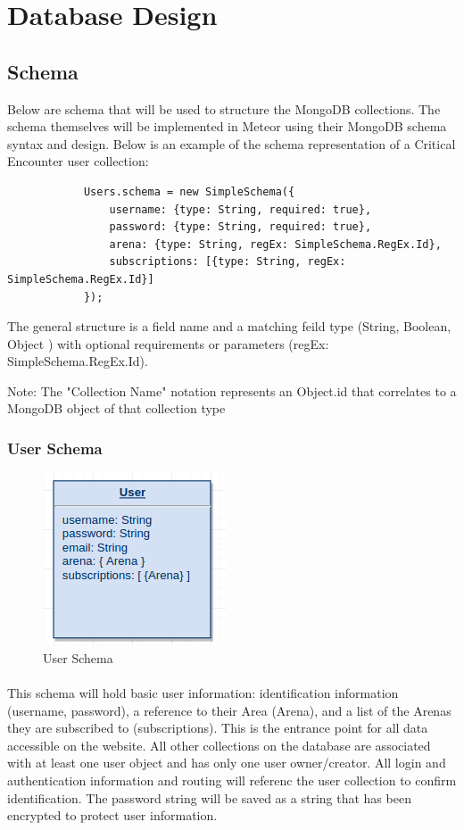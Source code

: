 \documentclass[12pt,a4paper]{report}
\begin{document}
\newpage
\section{Database Design}
	
\subsection{Schema}
		Below are schema that will be used to structure the MongoDB collections. The schema themselves will be implemented in Meteor using their MongoDB schema syntax and design. Below is an example of the schema representation of a Critical Encounter user collection:
		
		\begin{lstlisting}
			Users.schema = new SimpleSchema({
				username: {type: String, required: true},
				password: {type: String, required: true},
				arena: {type: String, regEx: SimpleSchema.RegEx.Id},
				subscriptions: [{type: String, regEx: SimpleSchema.RegEx.Id}]
			});
		\end{lstlisting}
		
		The general structure is a field name and a matching feild type (String, Boolean, Object ) with optional requirements or parameters (regEx: SimpleSchema.RegEx.Id).
		
		Note: The { "Collection Name" } notation represents an Object.id that correlates to a MongoDB object of that collection type
		\subsubsection{User Schema}
			\begin{figure}[h]
				\centering
				\includegraphics[scale=.75]{schema-user}
				\caption{User Schema}
				\label{fig: User Schema }
			\end{figure}
			
		\paragraph{}This schema will hold basic user information: identification information (username, password), a reference to their Area (Arena), and a list of the Arenas they are subscribed to (subscriptions). This is the entrance point for all data accessible on the website. All other collections on the database are associated with at least one user object and has only one user owner/creator. All login and authentication information and routing will referenc the user collection to confirm identification. The password string will be saved as a string that has been encrypted to protect user information.
\end{document}
